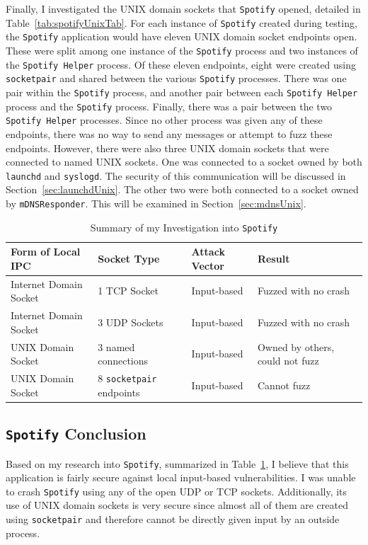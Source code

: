Finally, I investigated the UNIX domain sockets that \texttt{Spotify} opened, detailed in Table~\ref{tab:spotifyUnixTab}.  For each instance of \texttt{Spotify} created during testing, the \texttt{Spotify} application would have eleven UNIX domain socket endpoints open.  These were split among one instance of the \texttt{Spotify} process and two instances of the \texttt{Spotify Helper} process.  Of these eleven endpoints, eight were created using \texttt{socketpair} and shared between the various \texttt{Spotify} processes.  There was one pair within the \texttt{Spotify} process, and another pair between each \texttt{Spotify Helper} process and the \texttt{Spotify} process.  Finally, there was a pair between the two \texttt{Spotify Helper} processes.  Since no other process was given any of these endpoints, there was no way to send any messages or attempt to fuzz these endpoints.  However, there were also three UNIX domain sockets that were connected to named UNIX sockets.  One was connected to a socket owned by both \texttt{launchd} and \texttt{syslogd}.  The security of this communication will be discussed in Section~\ref{sec:launchdUnix}.  The other two were both connected to a socket owned by \texttt{mDNSResponder}.  This will be examined in Section~\ref{sec:mdnsUnix}.

\begin{table}
\centering
\begin{scriptsize}
\begin{tabular}{ l | l | l | l }
\textbf{Form of Local IPC} & \textbf{Socket Type} & \textbf{Attack Vector} & \textbf{Result} \\ \hline
Internet Domain Socket & 1 TCP Socket & Input-based & Fuzzed with no crash \\ \hline
Internet Domain Socket & 3 UDP Sockets & Input-based & Fuzzed with no crash \\ \hline
UNIX Domain Socket & 3 named connections & Input-based & Owned by others, could not fuzz \\ \hline
UNIX Domain Socket & 8 \texttt{socketpair} endpoints & Input-based & Cannot fuzz \\ \hline
\end{tabular}
\caption{Summary of my Investigation into \texttt{Spotify}}
\label{tab:spotifyData}
\end{scriptsize}
\end{table} 

\subsection{\texttt{Spotify} Conclusion}
\label{sec:spotifyConclusion}
Based on my research into \texttt{Spotify}, summarized in Table~\ref{tab:spotifyData}, I believe that this application is fairly secure against local input-based vulnerabilities.  I was unable to crash \texttt{Spotify} using any of the open UDP or TCP sockets.  Additionally, its use of UNIX domain sockets is very secure since almost all of them are created using \texttt{socketpair} and therefore cannot be directly given input by an outside process.

